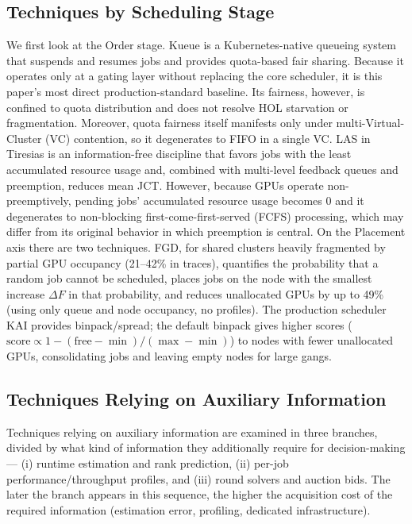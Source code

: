 \documentclass{ieeetj}
\begin{document}
\subsection{Techniques by Scheduling Stage}
We first look at the Order stage. Kueue\cite{kueue2024} is a Kubernetes-native queueing system that suspends and resumes jobs and provides quota-based fair sharing. Because it operates only at a gating layer without replacing the core scheduler, it is this paper's most direct production-standard baseline. Its fairness, however, is confined to quota distribution and does not resolve HOL starvation or fragmentation. Moreover, quota fairness itself manifests only under multi-Virtual-Cluster (VC) contention, so it degenerates to FIFO in a single VC. LAS in Tiresias\cite{gu2019tiresias} is an information-free discipline that favors jobs with the least accumulated resource usage and, combined with multi-level feedback queues and preemption, reduces mean JCT. However, because GPUs operate non-preemptively, pending jobs' accumulated resource usage becomes 0 and it degenerates to non-blocking first-come-first-served (FCFS) processing, which may differ from its original behavior in which preemption is central. On the Placement axis there are two techniques. FGD\cite{weng2023beware}, for shared clusters heavily fragmented by partial GPU occupancy (21--42\% in traces), quantifies the probability that a random job cannot be scheduled, places jobs on the node with the smallest increase $\Delta F$ in that probability, and reduces unallocated GPUs by up to 49\% (using only queue and node occupancy, no profiles). The production scheduler KAI\cite{kai2025} provides binpack/spread; the default binpack gives higher scores ($\text{score}\propto 1-(\text{free}-\min)/(\max-\min)$) to nodes with fewer unallocated GPUs, consolidating jobs and leaving empty nodes for large gangs.

\subsection{Techniques Relying on Auxiliary Information}
Techniques relying on auxiliary information are examined in three branches, divided by what kind of information they additionally require for decision-making --- (i) runtime estimation and rank prediction, (ii) per-job performance/throughput profiles, and (iii) round solvers and auction bids. The later the branch appears in this sequence, the higher the acquisition cost of the required information (estimation error, profiling, dedicated infrastructure).
\end{document}

